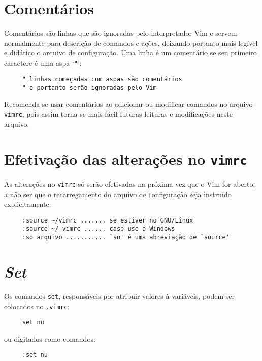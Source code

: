 \section{Comentários }
\label{Comentários }

Comentários são linhas que são ignoradas pelo interpretador Vim e servem
normalmente para descrição de comandos e ações, deixando portanto mais legível
e didático o arquivo de configuração. Uma linha é um comentário se seu
primeiro caractere é uma aspa `\verb+"+':

\begin{verbatim}
     " linhas começadas com aspas são comentários
     " e portanto serão ignoradas pelo Vim
\end{verbatim}

Recomenda-se usar comentários ao adicionar ou modificar comandos no arquivo
{\tt vimrc}, pois assim torna-se mais fácil futuras leituras e modificações
neste arquivo.

\section{Efetivação das alterações no \texttt{vimrc}}
\label{Efetivação das alterações no vimrc}

As alterações no {\tt vimrc} só serão efetivadas na próxima vez que o Vim for
aberto, a não ser que o recarregamento do arquivo de configuração seja
instruído explicitamente:

\begin{verbatim}
     :source ~/vimrc ....... se estiver no GNU/Linux
     :source ~/_vimrc ...... caso use o Windows
     :so arquivo ........... `so' é uma abreviação de `source'
\end{verbatim}

\section{{\em Set}}
\label{Set}

Os comandos {\tt set}, responsáveis por atribuir valores à variáveis,
 podem ser colocados no \verb|.vimrc|:

\begin{verbatim}
     set nu
\end{verbatim}

ou digitados como comandos:

\begin{verbatim}
     :set nu
\end{verbatim}


